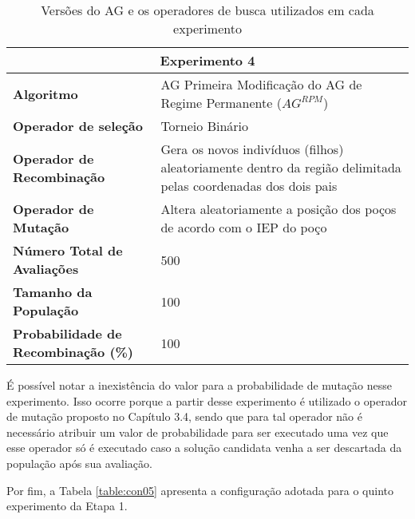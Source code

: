 \begin{table}[H]
\centering
\caption{Versões do AG e os operadores de busca utilizados em cada experimento}
\label{table:con04}
\begin{tabular}{|p{6cm}|p{9cm}|}
\hline
 
 \multicolumn{2}{|c|}{\textbf{Experimento 4}} \\ \hline
\textbf{Algoritmo} & AG Primeira Modificação do AG de Regime Permanente ($AG^{RPM}$) \\ \hline
\textbf{Operador de seleção} & Torneio Binário \\ \hline
\textbf{Operador de Recombinação} & Gera os novos indivíduos (filhos) aleatoriamente dentro da região delimitada pelas coordenadas dos dois pais \\  \hline
\textbf{Operador de Mutação} & Altera aleatoriamente a posição dos poços de acordo com o IEP do poço \\ \hline
\textbf{Número Total de Avaliações} & 500 \\ \hline
\textbf{Tamanho da População} & 100 \\ \hline
\textbf{Probabilidade de Recombinação (\%)} & 100 \\ \hline
\end{tabular}
\end{table}

É possível notar a inexistência do valor para a probabilidade de mutação nesse experimento. Isso ocorre porque a partir desse experimento é utilizado o operador de mutação proposto no Capítulo 3.4, sendo que para tal operador não é necessário atribuir um valor de probabilidade para ser executado uma vez que esse operador só é executado caso a solução candidata venha a ser descartada da população após sua avaliação.

Por fim, a Tabela \ref{table:con05} apresenta a configuração adotada para o quinto experimento da Etapa 1. 

